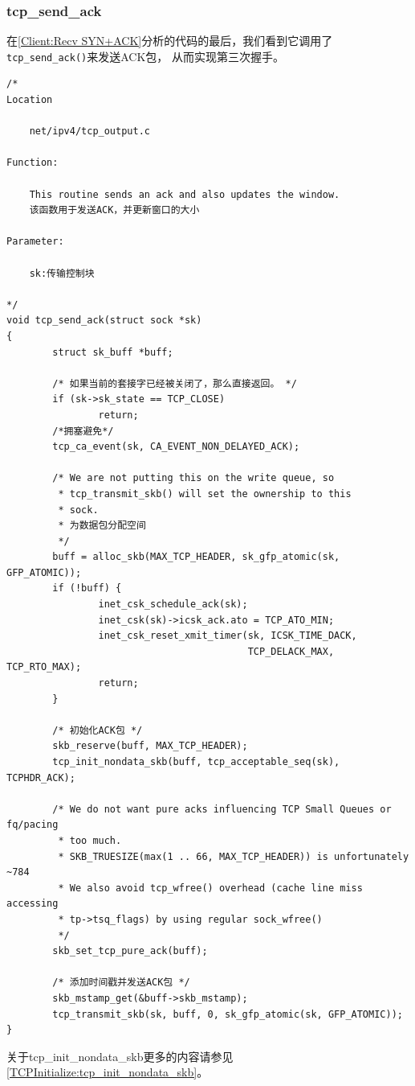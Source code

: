         \subsubsection{tcp\_send\_ack}
            \label{Client:tcp_send_ack}
                在\ref{Client:Recv SYN+ACK}分析的代码的最后，我们看到它调用了\texttt{tcp_send_ack()}来发送ACK包，
                从而实现第三次握手。

\begin{verbatim}
/* 
Location

    net/ipv4/tcp_output.c

Function:

    This routine sends an ack and also updates the window.
    该函数用于发送ACK，并更新窗口的大小 

Parameter:

    sk:传输控制块

*/
void tcp_send_ack(struct sock *sk)
{
        struct sk_buff *buff;

        /* 如果当前的套接字已经被关闭了，那么直接返回。 */
        if (sk->sk_state == TCP_CLOSE)
                return;
        /*拥塞避免*/
        tcp_ca_event(sk, CA_EVENT_NON_DELAYED_ACK);

        /* We are not putting this on the write queue, so
         * tcp_transmit_skb() will set the ownership to this
         * sock.
         * 为数据包分配空间
         */
        buff = alloc_skb(MAX_TCP_HEADER, sk_gfp_atomic(sk, GFP_ATOMIC));
        if (!buff) {
                inet_csk_schedule_ack(sk);
                inet_csk(sk)->icsk_ack.ato = TCP_ATO_MIN;
                inet_csk_reset_xmit_timer(sk, ICSK_TIME_DACK,
                                          TCP_DELACK_MAX, TCP_RTO_MAX);
                return;
        }

        /* 初始化ACK包 */
        skb_reserve(buff, MAX_TCP_HEADER);
        tcp_init_nondata_skb(buff, tcp_acceptable_seq(sk), TCPHDR_ACK);

        /* We do not want pure acks influencing TCP Small Queues or fq/pacing
         * too much.
         * SKB_TRUESIZE(max(1 .. 66, MAX_TCP_HEADER)) is unfortunately ~784
         * We also avoid tcp_wfree() overhead (cache line miss accessing
         * tp->tsq_flags) by using regular sock_wfree()
         */
        skb_set_tcp_pure_ack(buff);

        /* 添加时间戳并发送ACK包 */
        skb_mstamp_get(&buff->skb_mstamp);
        tcp_transmit_skb(sk, buff, 0, sk_gfp_atomic(sk, GFP_ATOMIC));
}
\end{verbatim}

        关于tcp\_init\_nondata\_skb更多的内容请参见\ref{TCPInitialize:tcp_init_nondata_skb}。


